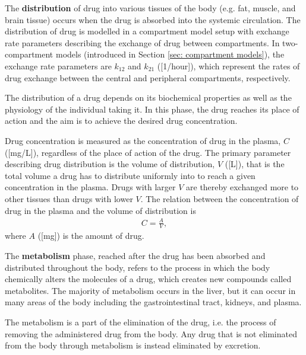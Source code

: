 The \textbf{distribution} of drug into various tissues of the body (e.g. fat, muscle, and brain tissue) occurs when the drug is absorbed into the systemic circulation. The distribution of drug is modelled in a compartment model setup with exchange rate parameters describing the exchange of drug between compartments. In two-compartment models (introduced in Section \ref{sec: compartment models}), the exchange rate parameters are $k_{12}$ and $k_{21}$ ([1/hour]), which represent the rates of drug exchange between the central and peripheral compartments, respectively. 

The distribution of a drug depends on its biochemical properties as well as the physiology of the individual taking it. In this phase, the drug reaches its place of action and the aim is to achieve the desired drug concentration. 

Drug concentration is measured as the concentration of drug in the plasma, $C$ ([mg/L]), regardless of the place of action of the drug. The primary parameter describing drug distribution is the volume of distribution, $V$ ([L]), that is the total volume a drug has to distribute uniformly into to reach a given concentration in the plasma. Drugs with larger $V$ are thereby exchanged more to other tissues than drugs with lower $V$. The relation between the concentration of drug in the plasma and the volume of distribution is
\begin{align} \label{eq: Concentration}
    C = \frac{A}{V},
\end{align}
where $A$ ([mg]) is the amount of drug. 


The \textbf{metabolism} phase, reached after the drug has been absorbed and distributed throughout the body, refers to the process in which the body chemically alters the molecules of a drug, which creates new compounds called metabolites. 
The majority of metabolism occurs in the liver, but it can occur in many areas of the body  including the gastrointestinal tract, kidneys, and plasma.

The metabolism is a part of the elimination of the drug, i.e. the process of removing the administered drug from the body. Any drug that is not eliminated from the body through metabolism is instead eliminated by excretion.


